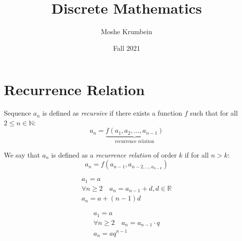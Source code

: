 \documentclass[00_complete]{subfiles}
\title{Discrete Mathematics}
\author{Moshe Krumbein}
\date{Fall 2021}
\begin{document}

\section{Recurrence Relation}
\begin{definition}[Recursion]
    Sequence $a_n$ is defined as \emph{recursive} if there exists a function $f$
    such that for all $2 \leq n \in \mathbb{N}$:
    $$a_n=\underbrace{f(a_1,a_2,\dots, a_{n-1})}_{\text{recurrence relation}}$$
\end{definition}
\begin{definition}
    We say that $a_n$ is defined as a \emph{recurrence relation} of order $k$
    if for all $n>k$:
    $$a_n=f(a_{n-1},a_{n-2,\dots,a_{n-k}})$$
\end{definition}
\begin{example}
\begin{gather*}
    a_1=a \\
    \forall n \geq 2 \quad a_n = a_{n-1}+d,d \in \mathbb{R} \\
    a_n = a+ (n-1)d
\end{gather*}
\end{example}
\begin{example}
\begin{gather*}
    a_1=a \\
    \forall n \geq 2 \quad a_n = a_{n-1} \cdot q \\
    a_n = aq^{n-1}
\end{gather*}
\end{example}
\end{document}
